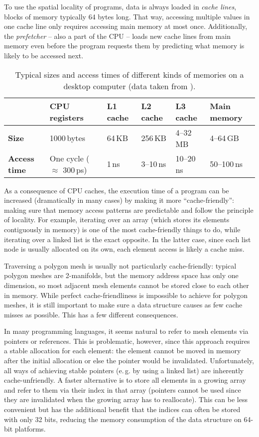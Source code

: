 To use the spatial locality of programs, data is always loaded in \emph{cache lines}, blocks of memory typically 64 bytes long.
That way, accessing multiple values in one cache line only requires accessing main memory at most once.
Additionally, the \emph{prefetcher} -- also a part of the CPU -- loads new cache lines from main memory even before the program requests them by predicting what memory is likely to be accessed next.

\begin{table}[t]
  \centering
  \sffamily
  \begin{tabular}{llllll}
  & \textbf{CPU registers} & \textbf{L1 cache} & \textbf{L2 cache} & \textbf{L3 cache} & \textbf{Main memory} \\\hline
  \textbf{Size} & 1000\,bytes & 64\,KB & 256\,KB & 4--32\,MB & 4--64\,GB \\\hline
  \textbf{Access time} & One cycle ($\approx$ 300\,ps) & 1\,ns & 3--10\,ns & 10--20\,ns & 50--100\,ns \\\hline
  \end{tabular}
  \caption{Typical sizes and access times of different kinds of memories on a desktop computer (data taken from \cite{hennessy2017computer}).}
  \label{tbl:caches}
  \vspace{5mm}
\end{table}

As a consequence of CPU caches, the execution time of a program can be increased (dramatically in many cases) by making it more \enquote{cache-friendly}: making sure that memory access patterns are predictable and follow the principle of locality.
For example, iterating over an array (which stores its elements contiguously in memory) is one of the most cache-friendly things to do, while iterating over a linked list is the exact opposite.
In the latter case, since each list node is usually allocated on its own, each element access is likely a cache miss.

Traversing a polygon mesh is usually not particularly cache-friendly:
typical polygon meshes are 2-manifolds, but the memory address space has only one dimension, so most adjacent mesh elements cannot be stored close to each other in memory.
While perfect cache-friendliness is impossible to achieve for polygon meshes, it is still important to make sure a data structure causes as few cache misses as possible.
This has a few different consequences.

In many programming languages, it seems natural to refer to mesh elements via pointers or references.
This is problematic, however, since this approach requires a stable allocation for each element: the element cannot be moved in memory after the initial allocation or else the pointer would be invalidated.
Unfortunately, all ways of achieving stable pointers (e.\,g. by using a linked list) are inherently cache-unfriendly.
A faster alternative is to store all elements in a growing array and refer to them via their index in that array (pointers cannot be used since they are invalidated when the growing array has to reallocate).
This can be less convenient but has the additional benefit that the indices can often be stored with only 32 bits, reducing the memory consumption of the data structure on 64-bit platforms.

